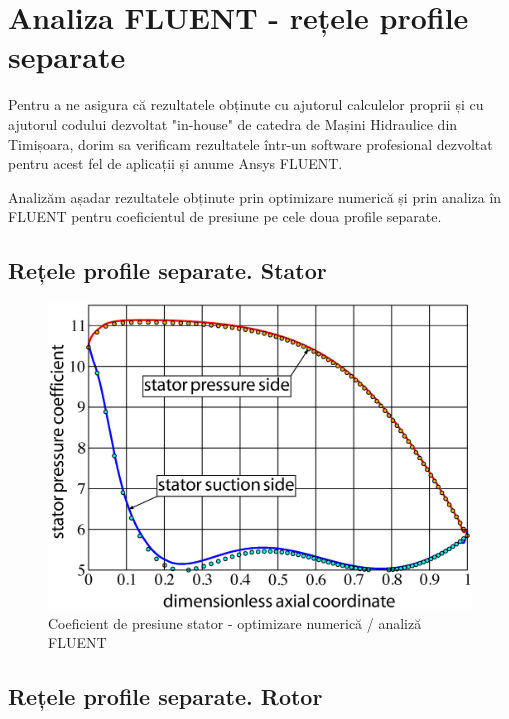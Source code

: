 \chapter{Analiza FLUENT - rețele profile separate}\label{chapter:analiza}

Pentru a ne asigura că rezultatele obținute cu ajutorul calculelor proprii și cu ajutorul codului dezvoltat "in-house" de catedra de Mașini Hidraulice din Timișoara, dorim sa verificam rezultatele într-un software profesional dezvoltat pentru acest fel de aplicații și anume Ansys FLUENT.

Analizăm așadar rezultatele obținute prin optimizare numerică și prin analiza în FLUENT pentru coeficientul de presiune pe cele doua profile separate.

\section{Rețele profile separate. Stator}

\begin{figure}[h]
	\centering
	\includegraphics[scale=0.5]{figures/cp-stator-ezdraw.eps}
	\caption{Coeficient de presiune stator - optimizare numerică / analiză FLUENT}
	\label{Coeficient de presiune stator - optimizare numerică / analiză FLUENT}
\end{figure}

\clearpage



\section{Rețele profile separate. Rotor}

